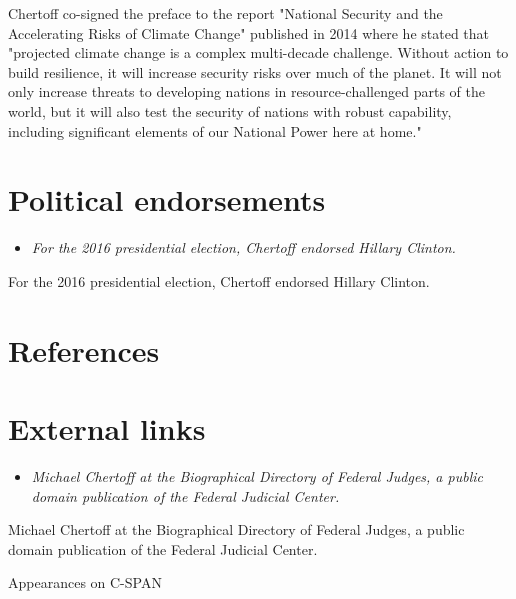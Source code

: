 Chertoff co-signed the preface to the report "National Security and the
Accelerating Risks of Climate Change" published in 2014 where he stated
that "projected climate change is a complex multi-decade challenge.
Without action to build resilience, it will increase security risks over
much of the planet. It will not only increase threats to developing
nations in resource-challenged parts of the world, but it will also test
the security of nations with robust capability, including significant
elements of our National Power here at home."

\section{Political endorsements}\label{political-endorsements}

\begin{itemize}
\item
  \emph{For the 2016 presidential election, Chertoff endorsed Hillary
  Clinton.}
\end{itemize}

For the 2016 presidential election, Chertoff endorsed Hillary Clinton.

\section{References}\label{references}

\section{External links}\label{external-links}

\begin{itemize}
\item
  \emph{Michael Chertoff at the Biographical Directory of Federal
  Judges, a public domain publication of the Federal Judicial Center.}
\end{itemize}

Michael Chertoff at the Biographical Directory of Federal Judges, a
public domain publication of the Federal Judicial Center.

Appearances on C-SPAN
